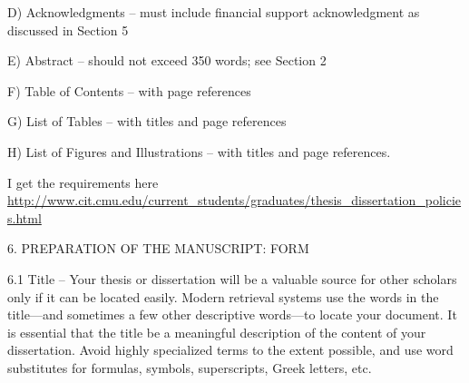 \documentclass[12pt]{cmuthesis}
\begin{document}
D) Acknowledgments – must include financial support acknowledgment as discussed in Section 5

E) Abstract – should not exceed 350 words; see Section 2

F) Table of Contents – with page references

G) List of Tables – with titles and page references

H) List of Figures and Illustrations – with titles and page references.



\tableofcontents
\listoffigures
\listoftables
\mainmatter


%
%
%
%
%


I get the requirements here
\href{http://www.cit.cmu.edu/current_students/graduates/thesis_dissertation_policies.html}{http://www.cit.cmu.edu/current_students/graduates/thesis_dissertation_policies.html}

6. PREPARATION OF THE MANUSCRIPT: FORM

 

6.1 Title – Your thesis or dissertation will be a valuable source for other scholars only if it can be located easily. Modern retrieval systems use the words in the title—and sometimes a few other descriptive words—to locate your document. It is essential that the title be a meaningful description of the content of your dissertation. Avoid highly specialized terms to the extent possible, and use word substitutes for formulas, symbols, superscripts, Greek letters, etc.

 
\end{document}
